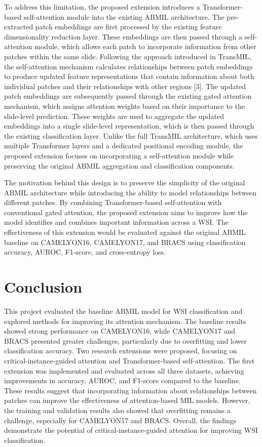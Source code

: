 \documentclass[journal]{IEEEtran}
\begin{document}
To address this limitation, the proposed extension introduces a Transformer-based self-attention module into the existing ABMIL architecture. The pre-extracted patch embeddings are first processed by the existing feature dimensionality reduction layer. These embeddings are then passed through a self-attention module, which allows each patch to incorporate information from other patches within the same slide. Following the approach introduced in TransMIL, the self-attention mechanism calculates relationships between patch embeddings to produce updated feature representations that contain information about both individual patches and their relationships with other regions [3]. The updated patch embeddings are subsequently passed through the existing gated attention mechanism, which assigns attention weights based on their importance to the slide-level prediction. These weights are used to aggregate the updated embeddings into a single slide-level representation, which is then passed through the existing classification layer. Unlike the full TransMIL architecture, which uses multiple Transformer layers and a dedicated positional encoding module, the proposed extension focuses on incorporating a self-attention module while preserving the original ABMIL aggregation and classification components.

The motivation behind this design is to preserve the simplicity of the original ABMIL architecture while introducing the ability to model relationships between different patches. By combining Transformer-based self-attention with conventional gated attention, the proposed extension aims to improve how the model identifies and combines important information across a WSI. The effectiveness of this extension would be evaluated against the original ABMIL baseline on CAMELYON16, CAMELYON17, and BRACS using classification accuracy, AUROC, F1-score, and cross-entropy loss.

\section{Conclusion}
This project evaluated the baseline ABMIL model for WSI classification and explored methods for improving its attention mechanism. The baseline results showed strong performance on CAMELYON16, while CAMELYON17 and BRACS presented greater challenges, particularly due to overfitting and lower classification accuracy. Two research extensions were proposed, focusing on critical-instance-guided attention and Transformer-based self-attention. The first extension was implemented and evaluated across all three datasets, achieving improvements in accuracy, AUROC, and F1-score compared to the baseline. These results suggest that incorporating information about relationships between patches can improve the effectiveness of attention-based MIL models. However, the training and validation results also showed that overfitting remains a challenge, especially for CAMELYON17 and BRACS. Overall, the findings demonstrate the potential of critical-instance-guided attention for improving WSI classification. 
\end{document}
